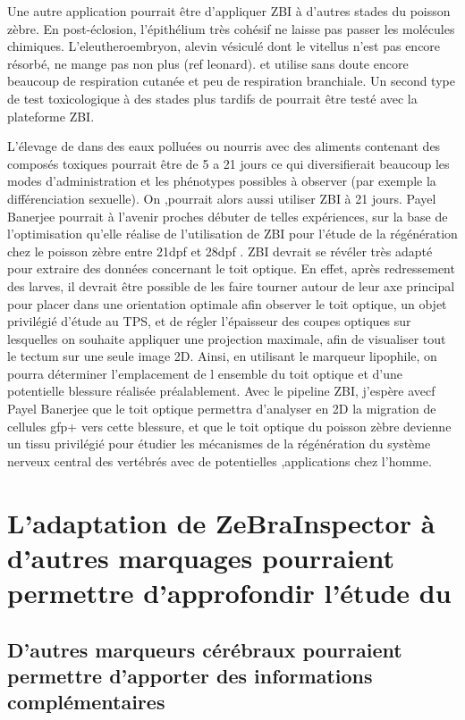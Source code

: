 \documentclass[\main/main.tex]{subfiles}
\begin{document}
Une autre application pourrait être d'appliquer ZBI à  d'autres stades du poisson zèbre.  En post-éclosion, l'épithélium très cohésif ne laisse pas passer les molécules chimiques. L'eleutheroembryon, alevin vésiculé dont le vitellus n'est pas encore résorbé, ne mange pas non plus (ref leonard). et utilise sans doute encore beaucoup de respiration cutanée et peu de respiration branchiale. Un second type de test toxicologique à des stades plus tardifs de \pz{} pourrait être testé avec la plateforme ZBI.

L'élevage de \pz{} dans des eaux polluées ou nourris avec des  aliments contenant des composés toxiques pourrait être de 5 a 21 jours ce qui diversifierait beaucoup les modes d'administration et les phénotypes possibles à observer (par exemple la différenciation sexuelle). On ,pourrait alors aussi utiliser ZBI à 21 jours. Payel Banerjee pourrait à l'avenir proches débuter de telles expériences, sur la base de l'optimisation qu'elle réalise de l'utilisation de ZBI pour l'étude de la régénération chez le poisson zèbre entre 21dpf et 28dpf . ZBI devrait se révéler très adapté pour extraire des données concernant le toit optique. En effet, après redressement des larves, il devrait être possible de les faire tourner autour de leur axe principal pour placer dans une orientation optimale afin observer le toit optique, un objet privilégié d'étude au TPS, et de régler l'épaisseur des coupes optiques sur lesquelles on souhaite appliquer une projection maximale, afin de visualiser tout le tectum sur une seule image 2D. Ainsi, en utilisant le marqueur lipophile, on pourra déterminer l'emplacement de l ensemble du toit optique et d'une potentielle blessure réalisée préalablement. Avec le pipeline ZBI, j'espère avecf Payel Banerjee que le toit optique permettra d'analyser en 2D la migration de cellules gfp+ vers cette blessure, et que le toit optique du poisson zèbre devienne un tissu privilégié pour étudier les mécanismes de la régénération du système nerveux central des vertébrés avec de potentielles ,applications chez l'homme.

\section{L'adaptation de ZeBraInspector à d'autres marquages pourraient permettre d'approfondir l'étude du \pz{}}
\label{sec:label}

    \subsection{D'autres marqueurs cérébraux pourraient permettre d'apporter des informations complémentaires}
   
\end{document}
